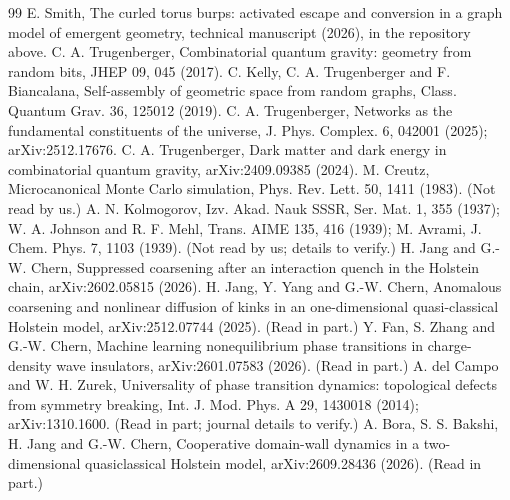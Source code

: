 \documentclass[aps,pre,10pt,twocolumn,superscriptaddress,nofootinbib]{revtex4-2}
\begin{document}
\begin{thebibliography}{99}
 E. Smith, The curled torus burps: activated escape and conversion in a graph model of emergent
geometry, technical manuscript (2026),  in the repository above.
 C. A. Trugenberger, Combinatorial quantum gravity: geometry from random bits, JHEP 09, 045 (2017).
 C. Kelly, C. A. Trugenberger and F. Biancalana, Self-assembly of geometric space from random
graphs, Class. Quantum Grav. 36, 125012 (2019).
 C. A. Trugenberger, Networks as the fundamental constituents of the universe, J. Phys. Complex. 6,
042001 (2025); arXiv:2512.17676.
 C. A. Trugenberger, Dark matter and dark energy in combinatorial quantum gravity, arXiv:2409.09385
(2024).
 M. Creutz, Microcanonical Monte Carlo simulation, Phys. Rev. Lett. 50, 1411 (1983). (Not read
by us.)
 A. N. Kolmogorov, Izv. Akad. Nauk SSSR, Ser. Mat. 1, 355 (1937); W. A. Johnson and R. F. Mehl, Trans.
AIME 135, 416 (1939); M. Avrami, J. Chem. Phys. 7, 1103 (1939). (Not read by us; details to verify.)
 H. Jang and G.-W. Chern, Suppressed coarsening after an interaction quench in the Holstein chain,
arXiv:2602.05815 (2026).
 H. Jang, Y. Yang and G.-W. Chern, Anomalous coarsening and nonlinear diffusion of kinks in an
one-dimensional quasi-classical Holstein model, arXiv:2512.07744 (2025). (Read in part.)
 Y. Fan, S. Zhang and G.-W. Chern, Machine learning nonequilibrium phase transitions in charge-density
wave insulators, arXiv:2601.07583 (2026). (Read in part.)
 A. del Campo and W. H. Zurek, Universality of phase transition dynamics: topological defects from
symmetry breaking, Int. J. Mod. Phys. A 29, 1430018 (2014); arXiv:1310.1600. (Read in part; journal details to
verify.)
 A. Bora, S. S. Bakshi, H. Jang and G.-W. Chern, Cooperative domain-wall dynamics in a
two-dimensional quasiclassical Holstein model, arXiv:2609.28436 (2026). (Read in part.)
\end{thebibliography}
\end{document}

